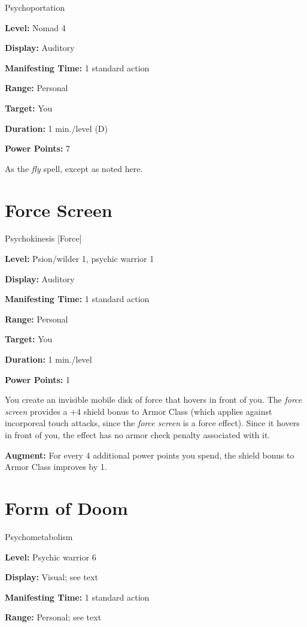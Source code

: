 \documentclass{article}
\begin{document}
Psychoportation

\textbf{Level:} Nomad 4

\textbf{Display:} Auditory

\textbf{Manifesting Time:} 1 standard action

\textbf{Range:} Personal

\textbf{Target:} You

\textbf{Duration:} 1 min./level (D)

\textbf{Power Points:} 7

As the \textit{fly} spell, except as noted here.

\vspace{12pt}
\section*{Force Screen}

Psychokinesis [Force]

\textbf{Level:} Psion/wilder 1, psychic warrior 1

\textbf{Display:} Auditory

\textbf{Manifesting Time:} 1 standard action

\textbf{Range:} Personal

\textbf{Target:} You

\textbf{Duration:} 1 min./level

\textbf{Power Points:} 1

You create an invisible mobile disk of force that hovers in front of you. The \textit{force 
screen }provides a +4 shield bonus to Armor Class (which applies against incorporeal 
touch attacks, since the \textit{force screen }is a force effect). Since it hovers 
in front of you, the effect has no armor check penalty associated with it.

\textbf{Augment:} For every 4 additional power points you spend, the shield bonus 
to Armor Class improves by 1.

\vspace{12pt}
\section*{Form of Doom}

Psychometabolism

\textbf{Level:} Psychic warrior 6

\textbf{Display:} Visual; see text

\textbf{Manifesting Time:} 1 standard action

\textbf{Range:} Personal; see text
\end{document}
